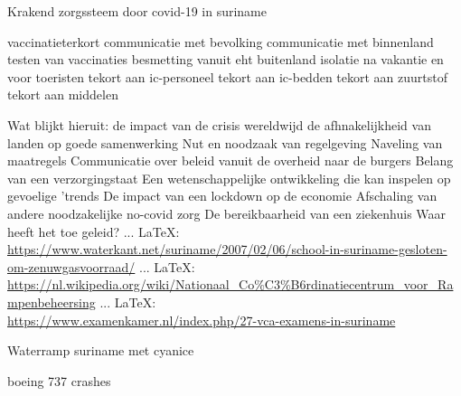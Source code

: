 \begin{thebibliography}{99}
{{{{%
Krakend zorgssteem door covid-19 in suriname

vaccinatieterkort
communicatie met bevolking
communicatie met binnenland
testen van vaccinaties
besmetting vanuit eht buitenland
isolatie na vakantie en voor toeristen
tekort aan ic-personeel
tekort aan ic-bedden
tekort aan zuurtstof
tekort aan middelen}

Wat blijkt hieruit:
de impact van de crisis wereldwijd
de afhnakelijkheid van landen op goede samenwerking
Nut en noodzaak van regelgeving
Naveling van maatregels
Communicatie over beleid vanuit de overheid naar de burgers
Belang van een verzorgingstaat
Een wetenschappelijke ontwikkeling die kan inspelen op gevoelige 'trends
De impact van een lockdown op de economie
Afschaling van andere noodzakelijke no-covid zorg
De bereikbaarheid van een ziekenhuis
Waar heeft het toe geleid?
 ... \LaTeX:\\ \url{https://www.waterkant.net/suriname/2007/02/06/school-in-suriname-gesloten-om-zenuwgasvoorraad/}
 ... \LaTeX:\\ \url{https://nl.wikipedia.org/wiki/Nationaal_Co%C3%B6rdinatiecentrum_voor_Rampenbeheersing}
 ... \LaTeX:\\ \url{https://www.examenkamer.nl/index.php/27-vca-examens-in-suriname}

Waterramp suriname met cyanice


boeing 737 crashes


}}}
\end{thebibliography}
